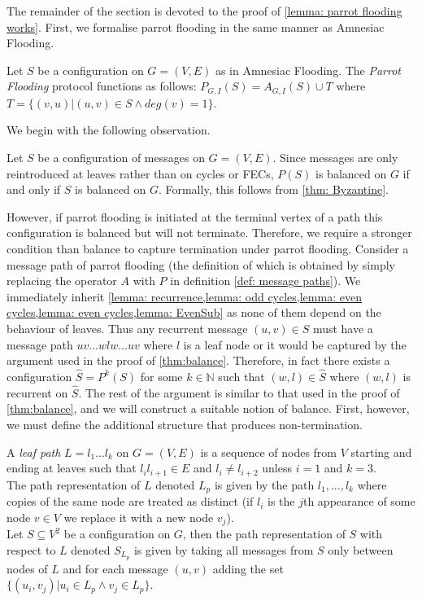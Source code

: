 The remainder of the section is devoted to the proof of \cref{lemma: parrot flooding works}.
First, we formalise parrot flooding in the same manner as Amnesiac Flooding.
\begin{definition}
    Let $S$ be a configuration on $G=(V,E)$ as in Amnesiac Flooding. The \emph{Parrot Flooding} protocol functions as follows: $P_{G,I}(S)=A_{G,I}(S)\cup T$ where $T=\{(v,u)|(u,v) \in S \wedge deg(v)=1\}$.
\end{definition}
We begin with the following observation.
\begin{observation}
    Let $S$ be a configuration of messages on $G=(V,E)$. Since messages are only reintroduced at leaves rather than on cycles or FECs, $P(S)$ is balanced on $G$ if and only if $S$ is balanced on $G$. Formally, this follows from \cref{thm: Byzantine}.
\end{observation}
However, if parrot flooding is initiated at the terminal vertex of a path this configuration is balanced but will not terminate.
Therefore, we require a stronger condition than balance to capture termination under parrot flooding.
Consider a message path of parrot flooding (the definition of which is obtained by simply replacing the operator $A$ with $P$ in definition \ref{def: message paths}).
We immediately inherit \cref{lemma: recurrence,lemma: odd cycles,lemma: even cycles,lemma: even cycles,lemma: EvenSub} as none of them depend on the behaviour of leaves.
Thus any recurrent message $(u,v) \in S$ must have a message path $uv...wlw...uv$ where $l$ is a leaf node or it would be captured by the argument used in the proof of \cref{thm:balance}.
Therefore, in fact there exists a configuration $\hat{S}=P^k(S)$ for some $k \in \mathbb{N}$ such that $(w,l)\in \hat{S}$ where $(w,l)$ is recurrent on $\hat{S}$.
The rest of the argument is similar to that used in the proof of \cref{thm:balance}, and we will construct a suitable notion of balance.
First, however, we must define the additional structure that produces non-termination.
\begin{definition}
    A \emph{leaf path} $L=l_1...l_k$ on $G=(V,E)$ is a sequence of nodes from $V$ starting and ending at leaves such that $l_il_{i+1} \in E$ and $l_i\neq l_{i+2}$ unless $i=1$ and $k=3$.\\
    The path representation of $L$ denoted $L_p$ is given by the path $l_1,...,l_k$ where copies of the same node are treated as distinct (if $l_i$ is the $j$th appearance of some node $v \in V$ we replace it with a new node $v_j$).\\
    Let $S\subseteq V^2$ be a configuration on $G$, then the path representation of $S$ with respect to $L$ denoted $S_{L_{p}}$ is given by taking all messages from $S$ only between nodes of $L$ and for each message $(u,v)$ adding the set $\{(u_i,v_j)|u_i \in L_p\wedge v_j \in L_p\}$.
\end{definition}
